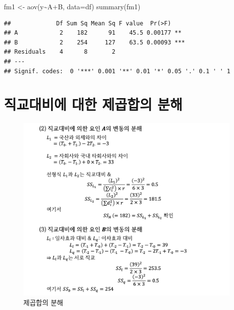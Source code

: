 \documentclass[
]{book}
\newenvironment{Shaded}{\begin{snugshade}}{\end{snugshade}}
\newcommand{\AttributeTok}[1]{\textcolor[rgb]{0.77,0.63,0.00}{#1}}
\newcommand{\FunctionTok}[1]{\textcolor[rgb]{0.00,0.00,0.00}{#1}}
\newcommand{\NormalTok}[1]{#1}
\newcommand{\OtherTok}[1]{\textcolor[rgb]{0.56,0.35,0.01}{#1}}
\newcommand{\SpecialCharTok}[1]{\textcolor[rgb]{0.00,0.00,0.00}{#1}}
\begin{document}
\begin{Shaded}
\begin{Highlighting}[]
\NormalTok{fm1 }\OtherTok{\textless{}{-}} \FunctionTok{aov}\NormalTok{(y}\SpecialCharTok{\textasciitilde{}}\NormalTok{A}\SpecialCharTok{+}\NormalTok{B, }\AttributeTok{data=}\NormalTok{df)}
\FunctionTok{summary}\NormalTok{(fm1)}
\end{Highlighting}
\end{Shaded}

\begin{verbatim}
##             Df Sum Sq Mean Sq F value  Pr(>F)    
## A            2    182      91    45.5 0.00177 ** 
## B            2    254     127    63.5 0.00093 ***
## Residuals    4      8       2                    
## ---
## Signif. codes:  0 '***' 0.001 '**' 0.01 '*' 0.05 '.' 0.1 ' ' 1
\end{verbatim}

\newpage

\hypertarget{uxc9c1uxad50uxb300uxbe44uxc5d0-uxb300uxd55c-uxc81cuxacf1uxd569uxc758-uxbd84uxd574}{%
\section{직교대비에 대한 제곱합의 분해}\label{uxc9c1uxad50uxb300uxbe44uxc5d0-uxb300uxd55c-uxc81cuxacf1uxd569uxc758-uxbd84uxd574}}

\begin{figure}
\centering
\includegraphics{slide03.png}
\caption{제곱합의 분해}
\end{figure}
\end{document}
